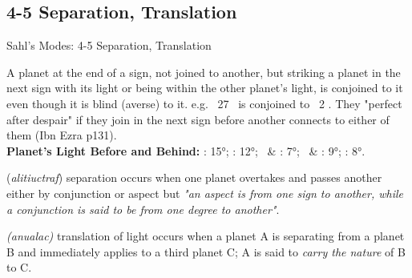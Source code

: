 \subsection{4-5 Separation, Translation}
\begin{frame}[t]{Sahl's Modes: 4-5 Separation, Translation}
\begin{description}[style=nextline]
\item[3. Connection Cont'd] A planet at the end of a sign, not joined to another, but striking a planet in the next sign with its light or being within the other planet's light, is conjoined to it even though it is blind (averse) to it\footnotemark[1]. e.g. \Moon\ 27 \Aries\ is conjoined to \Venus\ 2 \Taurus. They "perfect after despair" if they join in the next sign before another connects to either of them (Ibn Ezra p131). \\
\vspace{1em}
\textbf{Planet's Light Before and Behind:} \Sun: 15°; \Moon: 12°; \Venus\ \& \Mercury: 7°; \Jupiter\ \& \Saturn: 9°; \Mars: 8°. \\

\item[4. Separation] (\textsl{alitiuctraf}) separation occurs when one planet overtakes and passes another either by conjunction or aspect but \textsl{"an aspect is from one sign to another, while a conjunction is said to be from one degree to another"}. \\

\item[5. Translation] \textsl{(anualac)} translation of light occurs when a planet A is separating from a planet B and immediately applies to a third planet C; A is said to \textsl{carry the nature} of B to C. 
\end{description}

\end{frame}

